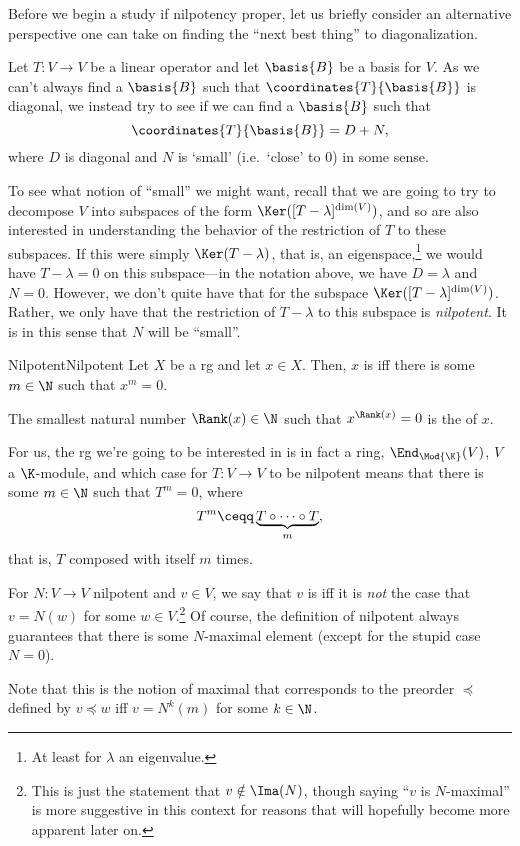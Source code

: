 Before we begin a study if nilpotency proper, let us briefly consider an alternative perspective one can take on finding the ``next best thing'' to diagonalization.

Let $T\colon V\rightarrow V$ be a linear operator and let $\basis{B}$ be a basis for $V$.  As we can't always find a $\basis{B}$ such that $\coordinates{T}{\basis{B}}$ is diagonal, we instead try to see if we can find a $\basis{B}$ such that
\begin{equation}
	\coordinates{T}{\basis{B}}=D+N,
\end{equation}
where $D$ is diagonal and $N$ is `small' (i.e.~`close' to $0$) in some sense.

To see what notion of ``small'' we might want, recall that we are going to try to decompose $V$ into subspaces of the form $\Ker ([T-\lambda ]^{\dim (V)})$, and so are also interested in understanding the behavior of the restriction of $T$ to these subspaces.  If this were simply $\Ker (T-\lambda )$, that is, an eigenspace,\footnote{At least for $\lambda$ an eigenvalue.} we would have $T-\lambda =0$ on this subspace---in the notation above, we have $D=\lambda$ and $N=0$.  However, we don't quite have that for the subspace $\Ker ([T-\lambda ]^{\dim (V)})$.  Rather, we only have that the restriction of $T-\lambda$ to this subspace is \emph{nilpotent}.  It is in this sense that $N$ will be ``small''.
\begin{dfn}{Nilpotent}{Nilpotent}
	Let $X$ be a rg and let $x\in X$.  Then, $x$ is  iff there is some $m\in \N$ such that $x^m=0$.
	\begin{rmk}
		The smallest natural number $\Rank (x)\in \N$ such that $x^{\Rank (x)}=0$ is the  of $x$.
	\end{rmk}
	\begin{rmk}
		For us, the rg we're going to be interested in is in fact a ring, $\End _{\Mod{\K}}(V)$, $V$ a $\K$-module, and which case for $T\colon V\rightarrow V$ to be nilpotent means that there is some $m\in \N$ such that $T^m=0$, where
		\begin{equation}
			T^m\ceqq \underbrace{T\circ \cdots \circ T}_m,
		\end{equation}
		that is, $T$ composed with itself $m$ times.
	\end{rmk}
	\begin{rmk}
		For $N\colon V\rightarrow V$ nilpotent and $v\in V$, we say that $v$ is  iff it is \emph{not} the case that $v=N(w)$ for some $w\in V$.\footnote{This is just the statement that $v\notin \Ima (N)$, though saying ``$v$ is $N$-maximal'' is more suggestive in this context for reasons that will hopefully become more apparent later on.}  Of course, the definition of nilpotent always guarantees that there is some $N$-maximal element (except for the stupid case $N=0$).
		
		Note that this is the notion of maximal that corresponds to the preorder $\preceq$ defined by $v\preceq w$ iff $v=N^k(m)$ for some $k\in \N$.
	\end{rmk}
\end{dfn}
